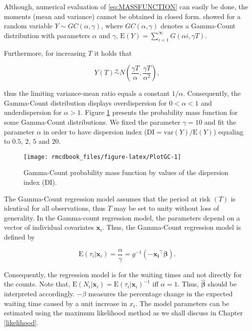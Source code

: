 \documentclass[9pt,a5paper,]{book}
\theoremstyle{definition}
\theoremstyle{definition}
\theoremstyle{remark}
\begin{document}
Although, numerical evaluation of \eqref{eq:MASSFUNCTION} can easily be
done, the moments (mean and variance) cannot be obtained in closed form.
\citet{Winkelman1995} showed for a random variable
\(Y \sim GC(\alpha, \gamma)\), where \(GC(\alpha, \gamma)\) denotes a
Gamma-Count distribution with parameters \(\alpha\) and \(\gamma\),
\(\mathrm{E}(Y) = \sum_{i = 1}^\infty G(\alpha i, \gamma T)\).

Furthermore, for increasing \(T\) it holds that

\begin{equation}
Y(T) \overset{a}{\sim} N\left(\frac{\gamma T}{\alpha}, \frac{\gamma T}{\alpha^2} \right), 
\end{equation}

thus the limiting variance-mean ratio equals a constant \(1/\alpha\).
Consequently, the Gamma-Count distribution displays overdispersion for
\(0 < \alpha < 1\) and underdispersion for \(\alpha > 1\). Figure
\ref{fig:PlotGC} presents the probability mass function for some
Gamma-Count distributions. We fixed the parameter \(\gamma = 10\) and
fit the parameter \(\alpha\) in order to have dispersion index
(\(\mathrm{DI} = \mathrm{var}(Y)/\mathrm{E}(Y)\)) equaling to \(0.5\),
\(2\), \(5\) and \(20\).

\begin{figure}[h]

{\centering \texttt{[image: rmcdbook\_files/figure-latex/PlotGC-1]} 

}

\caption{Gamma-Count probability mass function by values of the dispersion index (DI).}\label{fig:PlotGC}
\end{figure}

The Gamma-Count regression model assumes that the period at risk \((T)\)
is identical for all observations, thus \(T\) may be set to unity
without loss of generality. In the Gamma-count regression model, the
parameters depend on a vector of individual covariates
\(\boldsymbol{x}_i\). Thus, the Gamma-Count regression model is defined
by

\begin{equation}
\mathrm{E}(\tau_i | \boldsymbol{x}_i) = \frac{\alpha}{\gamma} = g^{-1}(-\boldsymbol{x_i}^\top \boldsymbol{\beta}).
\end{equation}

Consequently, the regression model is for the waiting times and not
directly for the counts. Note that,
\(\mathrm{E}(N_i | \boldsymbol{x}_i) = \mathrm{E}(\tau_i | \boldsymbol{x}_i)^{-1}\)
iff \(\alpha = 1\). Thus, \(\hat{\boldsymbol{\beta}}\) should be
interpreted accordingly. \(-\beta\) measures the percentage change in
the expected waiting time caused by a unit increase in \(x_i\). The
model parameters can be estimated using the maximum likelihood method as
we shall discuss in Chapter \ref{likelihood}.
\end{document}

